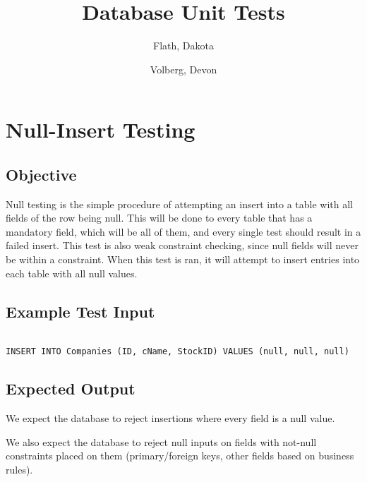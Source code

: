 \documentclass[12pt]{article}
\author{
	Flath, Dakota\\
	\and
	Volberg, Devon\\
}
\begin{document}
\renewcommand{\baselinestretch}{1.15} %
\setlength{\parindent}{0pt} %
\setlength{\parskip}{0.8em} %

\title{Database Unit Tests}
\maketitle

\newpage

\section{Null-Insert Testing}

\subsection{Objective}

Null testing is the simple procedure of attempting an insert into a table with all fields of the row being null. This will be done to every table that has a mandatory field, which will be all of them, and every single test should result in a failed insert. This test is also weak constraint checking, since null fields will never be within a constraint. When this test is ran, it will attempt to insert entries into each table with all null values.

\subsection{Example Test Input}

\begin{verbatim}

INSERT INTO Companies (ID, cName, StockID) VALUES (null, null, null)

\end{verbatim}

\subsection{Expected Output}

We expect the database to reject insertions where every field is a null value.

We also expect the database to reject null inputs on fields with not-null constraints placed on them (primary/foreign keys, other fields based on business rules). 
\end{document}
